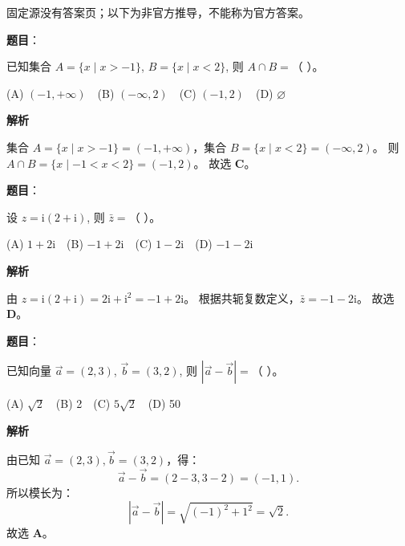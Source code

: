 
\begin{gktip}
固定源没有答案页；以下为非官方推导，不能称为官方答案。
\end{gktip}


\begin{answer}

\textbf{题目}：

已知集合 $A = \{x \mid x > -1\}$, $B = \{x \mid x < 2\}$, 则 $A \cap B =$（ ）。

(A) $(-1, +\infty)$　(B) $(-\infty, 2)$　(C) $(-1, 2)$　(D) $\varnothing$

\textbf{解析}

集合 $A = \{x \mid x > -1\} = (-1, +\infty)$，集合 $B = \{x \mid x < 2\} = (-\infty, 2)$。
则 $A \cap B = \{x \mid -1 < x < 2\} = (-1, 2)$。
故选 \textbf{C}。


\end{answer}
\begin{answer}

\textbf{题目}：

设 $z = \mathrm{i}(2 + \mathrm{i})$, 则 $\bar{z} =$（ ）。

(A) $1 + 2\mathrm{i}$　(B) $-1 + 2\mathrm{i}$　(C) $1 - 2\mathrm{i}$　(D) $-1 - 2\mathrm{i}$

\textbf{解析}

由 $z = \mathrm{i}(2 + \mathrm{i}) = 2\mathrm{i} + \mathrm{i}^2 = -1 + 2\mathrm{i}$。
根据共轭复数定义，$\bar{z} = -1 - 2\mathrm{i}$。
故选 \textbf{D}。


\end{answer}
\begin{answer}

\textbf{题目}：

已知向量 $\vec{a} = (2, 3)$, $\vec{b} = (3, 2)$, 则 $|\vec{a} - \vec{b}| =$（ ）。

(A) $\sqrt{2}$　(B) 2　(C) $5\sqrt{2}$　(D) 50

\textbf{解析}

由已知 $\vec{a} = (2, 3), \vec{b} = (3, 2)$，得：
\nopagebreak[4]
\[\vec{a} - \vec{b} = (2 - 3, 3 - 2) = (-1, 1).\]
所以模长为：
\nopagebreak[4]
\[|\vec{a} - \vec{b}| = \sqrt{(-1)^2 + 1^2} = \sqrt{2}.\]
故选 \textbf{A}。


\end{answer}
